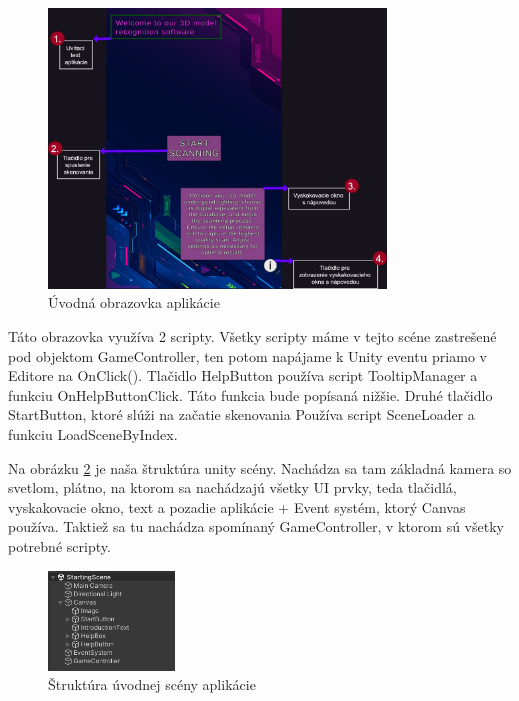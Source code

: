 \begin{figure}[h]
  \centering
  \includegraphics[width=0.8\textwidth]{img/Introduction_scene.jpg}
  \caption{Úvodná obrazovka aplikácie}
  \label{fig:introductionScene}
\end{figure}


Táto obrazovka využíva 2 scripty. Všetky scripty máme v tejto scéne zastrešené pod objektom GameController, ten potom napájame k Unity eventu priamo v Editore na OnClick(). Tlačidlo HelpButton používa script TooltipManager a funkciu OnHelpButtonClick. Táto funkcia bude popísaná nižšie. Druhé tlačidlo StartButton, ktoré slúži na začatie skenovania Používa script SceneLoader a funkciu LoadSceneByIndex. 

Na obrázku \ref{fig:introductionSceneStructure} je naša štruktúra unity scény. Nachádza sa tam základná kamera so svetlom, plátno, na ktorom sa nachádzajú všetky UI prvky, teda tlačidlá, vyskakovacie okno, text a pozadie aplikácie + Event systém, ktorý Canvas používa. Taktiež sa tu nachádza spomínaný GameController, v ktorom sú všetky potrebné scripty.  

\begin{figure}[h]
  \centering
  \includegraphics[width=0.3\textwidth]{img/structure_introduction.png}
  \caption{Štruktúra úvodnej scény aplikácie}
  \label{fig:introductionSceneStructure}
\end{figure}

